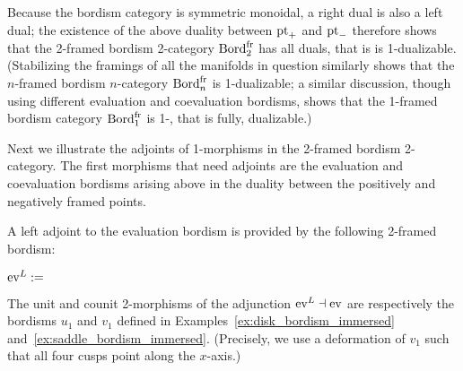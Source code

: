 \documentclass{amsart}
\begin{document}
Because the bordism category is symmetric monoidal, a right dual is also a left dual; the existence of the above duality between $\mathrm{pt}_+$ and $\mathrm{pt}_-$ therefore shows that the 2-framed bordism 2-category $\mathrm{Bord}^\mathrm{fr}_2$ has all duals, that is is 1-dualizable.  (Stabilizing the framings of all the manifolds in question similarly shows that the $n$-framed bordism $n$-category $\mathrm{Bord}^\mathrm{fr}_n$ is 1-dualizable; a similar discussion, though using different evaluation and coevaluation bordisms, shows that the 1-framed bordism category $\mathrm{Bord}^\mathrm{fr}_1$ is 1-, that is fully, dualizable.)

Next we illustrate the adjoints of 1-morphisms in the 2-framed bordism 2-category.  The first morphisms that need adjoints are the evaluation and coevaluation bordisms arising above in the duality between the positively and negatively framed points.

\begin{example} \label{eg:evlevadj}
A left adjoint to the evaluation bordism is provided by the following 2-framed bordism:
\begin{center}
	$\mathrm{ev}^L := $ 
\end{center}
The unit and counit 2-morphisms of the adjunction $\mathrm{ev}^L \dashv \mathrm{ev}$ are respectively the bordisms $u_1$ and $v_1$ defined in Examples~\ref{ex:disk_bordism_immersed} and~\ref{ex:saddle_bordism_immersed}.  (Precisely, we use a deformation of $v_1$ such that all four cusps point along the $x$-axis.)
\end{example}
\end{document}
